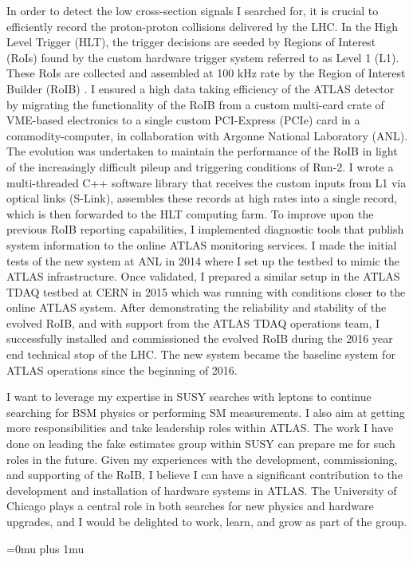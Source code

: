 \documentclass[a4paper]{article}
\begin{document}
In order to detect the low cross-section signals I searched for, it is crucial to efficiently record the proton-proton collisions delivered by the LHC.
In the High Level Trigger (HLT), the trigger decisions are seeded by Regions of Interest (RoIs)
found by the custom hardware trigger system referred to as Level 1 (L1).
These RoIs are collected and assembled at 100 kHz rate by the Region of Interest Builder (RoIB)
\cite{proc-TWEPP2015-RoIB}.
I ensured a high data taking efficiency of the ATLAS detector by migrating the functionality of the RoIB from a custom multi-card crate of VME-based
electronics to a single custom PCI-Express (PCIe) card in a commodity-computer, in collaboration with Argonne National Laboratory (ANL).
The evolution was undertaken to maintain the performance of the RoIB in light of the increasingly difficult pileup and triggering conditions of Run-2.
I wrote a multi-threaded C++ software library that receives the custom inputs from L1 via optical links (S-Link),
 assembles these records at high rates into a single record, which is then forwarded to the HLT computing farm.
To improve upon the previous RoIB reporting capabilities,
I implemented diagnostic tools that publish system information to the online ATLAS monitoring services.
I made the initial tests of the new system at ANL in 2014 where I set up the testbed to
mimic the ATLAS infrastructure. Once validated, I prepared a similar setup in the ATLAS TDAQ testbed at CERN in 2015 which was running with conditions
closer to the online ATLAS system. After demonstrating the reliability and stability of the evolved RoIB, and with support
from the ATLAS TDAQ operations team,
I successfully installed and commissioned the evolved RoIB during the 2016 year end technical stop of the LHC.
The new system became the baseline system for ATLAS operations since the beginning of 2016.

I want to leverage my expertise in SUSY searches with leptons to continue searching for BSM physics or performing SM measurements. I also
aim at getting more responsibilities and take leadership roles within ATLAS. The work I have done on
leading the fake estimates group within SUSY can prepare me for such roles in the future.
Given my experiences with the development, commissioning, and supporting of the RoIB, I believe I can have a
significant contribution to the development and installation of hardware systems in ATLAS.
The University of Chicago plays a central role in both searches for new physics and hardware upgrades, and I would be delighted to work,
learn, and grow as part of the group.





\Urlmuskip=0mu plus 1mu\relax
{%
\fontsize{9}{4}
\selectfont
}{}

\end{document}
